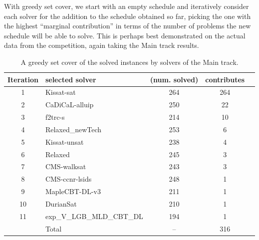 \documentclass{elsarticle}
\begin{document}
With greedy set cover, we start with an empty schedule and iteratively consider 
each solver for the addition to the schedule obtained so far, picking the one
with the highest ``marginal contribution'' in terms of the number of problems
the new schedule will be able to solve. This is perhaps best demonstrated on
the actual data from the competition, again taking the Main track results. 

\begin{table}
\caption{A greedy set cover of the solved instances by solvers of the Main track.}
\label{tab:gscMain}
\begin{center}
\begin{tabular}{clccc}
Iteration & selected solver & (num. solved) & contributes \\ %
\hline
\phantom{0}1 & Kissat-sat & 264 & 264 \\ %
\phantom{0}2 & CaDiCaL-alluip & 250 & \phantom{0}22 \\ %
\phantom{0}3 & f2trc-s & 214 & \phantom{0}10 \\ %
\phantom{0}4 & Relaxed\_newTech & 253 & \phantom{00}6 \\ %
\phantom{0}5 & Kissat-unsat & 238 & \phantom{00}4 \\ %
\phantom{0}6 & Relaxed & 245 & \phantom{00}3 \\ %
\phantom{0}7 & CMS-walksat & 243 & \phantom{00}3 \\ %
\phantom{0}8 & CMS-ccnr-lsids & 248 & \phantom{00}1 \\ %
\phantom{0}9 & MapleCBT-DL-v3 & 211 & \phantom{00}1 \\ %
10 & DurianSat & 210 & \phantom{00}1 \\ %
11 & exp\_V\_LGB\_MLD\_CBT\_DL & 194 & \phantom{00}1 \\ %
\hline
 & Total & -- & 316 \\
\end{tabular}
\end{center}
\end{table}
\end{document}
